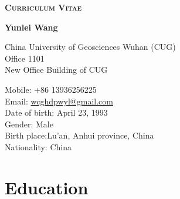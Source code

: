 \documentclass[11pt]{article} %
\begin{document}

\begin{center}
{\huge \bfseries\scshape Curriculum Vitae}
\end{center}
\vspace{0.05\textheight}
{\LARGE\bfseries Yunlei Wang}%
\bigskip %

China University of Geosciences Wuhan (CUG)\\ %
Office 1101\\ New Office Building of CUG

\vspace{0.01\textheight} 

Mobile: +86 13936256225\\ %
Email: \href{wcghdpwyl@gmail.com}{wcghdpwyl@gmail.com}\\%
\vspace{0.01\textheight}%
Date of birth: April 23, 1993\\
Gender: Male\\
Birth place:Lu'an, Anhui province, China\\ %
Nationality: China\hfill {} %


\section*{Education}
\end{document}
